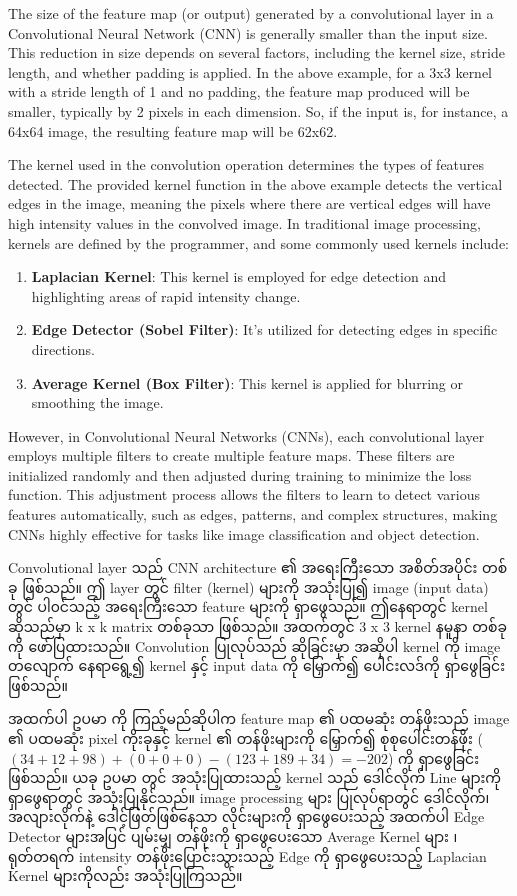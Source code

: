 The size of the feature map (or output) generated by a convolutional layer in a Convolutional Neural Network (CNN) is generally smaller than the input size. This reduction in size depends on several factors, including the kernel size, stride length, and whether padding is applied. In the above example, for a 3x3 kernel with a stride length of 1 and no padding, the feature map produced will be smaller, typically by 2 pixels in each dimension. So, if the input is, for instance, a 64x64 image, the resulting feature map will be 62x62.

The kernel used in the convolution operation determines the types of features detected. The provided kernel function in the above example detects the vertical edges in the image, meaning the pixels where there are vertical edges will have high intensity values in the convolved image. In traditional image processing, kernels are defined by the programmer, and some commonly used kernels include:
\begin{enumerate}
\item \textbf{Laplacian Kernel}: This kernel is employed for edge detection and highlighting areas of rapid intensity change.
\item \textbf{Edge Detector (Sobel Filter)}: It's utilized for detecting edges in specific directions.
\item \textbf{Average Kernel (Box Filter)}: This kernel is applied for blurring or smoothing the image.
\end{enumerate}

However, in Convolutional Neural Networks (CNNs), each convolutional layer employs multiple filters to create multiple feature maps. These filters are initialized randomly and then adjusted during training to minimize the loss function. This adjustment process allows the filters to learn to detect various features automatically, such as edges, patterns, and complex structures, making CNNs highly effective for tasks like image classification and object detection.

Convolutional layer သည် CNN  architecture ၏ အရေးကြီးသော အစိတ်အပိုင်း တစ်ခု ဖြစ်သည်။ ဤ layer တွင် filter (kernel) များကို အသုံးပြု၍ image (input data) တွင် ပါ၀င်သည့် အရေးကြီးသော feature များကို ရှာဖွေသည်။ ဤနေရာတွင် kernel ဆိုသည်မှာ k x k matrix တစ်ခုသာ ဖြစ်သည်။ အထက်တွင် 3 x 3 kernel နမူနာ တစ်ခုကို ဖော်ပြထားသည်။ Convolution ပြုလုပ်သည် ဆိုခြင်းမှာ အဆိုပါ kernel ကို image တလျောက် နေရာရွေ့၍  kernel နှင့် input data ကို မြှောက်၍ ပေါင်းလဒ်ကို ရှာဖွေခြင်း ဖြစ်သည်။ 

အထက်ပါ ဥပမာ ကို ကြည့်မည်ဆိုပါက feature map ၏ ပထမဆုံး တန်ဖိုးသည် image ၏ ပထမဆုံး pixel ကိုးခုနှင့် kernel ၏ တန်ဖိုးများကို မြှောက်၍ စုစုပေါင်းတန်ဖိုး  ($(34+12+98)+(0+0+0)-(123+189+34) =-202$) ကို ရှာဖွေခြင်း ဖြစ်သည်။ ယခု ဥပမာ တွင် အသုံးပြုထားသည့် kernel သည် ဒေါင်လိုက် Line များကို ရှာဖွေရာတွင် အသုံးပြုနိုင်သည်။ image processing များ ပြုလုပ်ရာတွင် ဒေါင်လိုက်၊ အလျားလိုက်နဲ့ ဒေါင့်ဖြတ်ဖြစ်နေသာ လိုင်းများကို ရှာဖွေပေးသည့် အထက်ပါ Edge Detector များအပြင် ပျမ်းမျှ တန်ဖိုးကို ရှာဖွေပေးသော Average Kernel များ ၊ ရုတ်တရက် intensity တန်ဖိုးပြောင်းသွားသည့် Edge ကို ရှာဖွေပေးသည့် Laplacian Kernel များကိုလည်း အသုံးပြုကြသည်။ 

